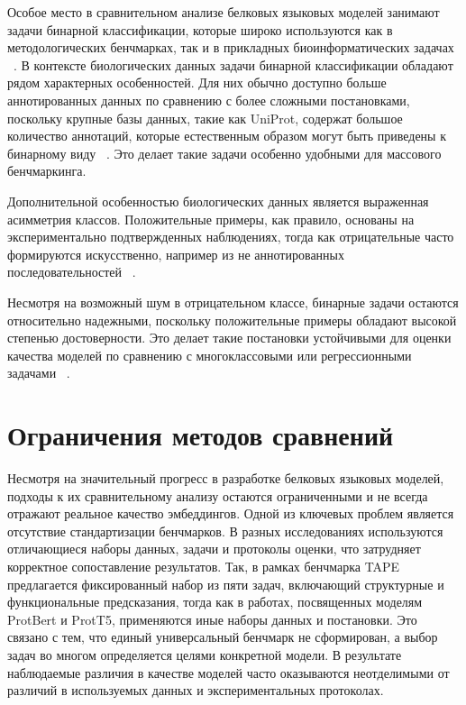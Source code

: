 \documentclass[specification,annotation,times]{itmo-student-thesis}
\begin{document}
Особое место в сравнительном анализе белковых языковых моделей занимают задачи бинарной классификации, которые широко используются как в методологических бенчмарках, так и в прикладных биоинформатических задачах ~\cite{suzek2007uniref, klausen2019netsurfp}. В контексте биологических данных задачи бинарной классификации обладают рядом характерных особенностей. Для них обычно доступно больше аннотированных данных по сравнению с более сложными постановками, поскольку крупные базы данных, такие как UniProt, содержат большое количество аннотаций, которые естественным образом могут быть приведены к бинарному виду ~\cite{uniprot2021uniprot}. Это делает такие задачи особенно удобными для массового бенчмаркинга.

Дополнительной особенностью биологических данных является выраженная асимметрия классов. Положительные примеры, как правило, основаны на экспериментально подтвержденных наблюдениях, тогда как отрицательные часто формируются искусственно, например из не аннотированных последовательностей  ~\cite{heinzinger2019modeling}.

Несмотря на возможный шум в отрицательном классе, бинарные задачи остаются относительно надежными, поскольку положительные примеры обладают высокой степенью достоверности. Это делает такие постановки устойчивыми для оценки качества моделей по сравнению с многоклассовыми или регрессионными задачами ~\cite{rao2019evaluating}.

\section{Ограничения методов сравнений}
Несмотря на значительный прогресс в разработке белковых языковых моделей, подходы к их сравнительному анализу остаются ограниченными и не всегда отражают реальное качество эмбеддингов. 
Одной из ключевых проблем является отсутствие стандартизации бенчмарков. В разных исследованиях используются отличающиеся наборы данных, задачи и протоколы оценки, что затрудняет корректное сопоставление результатов. 
Так, в рамках бенчмарка TAPE ~\cite{rao2019evaluating} предлагается фиксированный набор из пяти задач, включающий структурные и функциональные предсказания, тогда как в работах, посвященных моделям ProtBert и ProtT5, применяются иные наборы данных и постановки. 
Это связано с тем, что единый универсальный бенчмарк не сформирован, а выбор задач во многом определяется целями конкретной модели. В результате наблюдаемые различия в качестве моделей часто оказываются неотделимыми от различий в используемых данных и экспериментальных протоколах.
\end{document}
